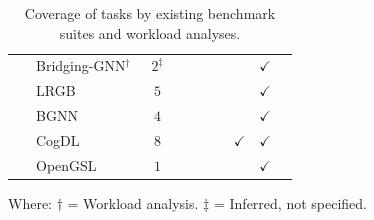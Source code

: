 \begin{landscape}
\begin{table}[htbp]
{\begin{tabular}{ll|cccccccc}
                { ~              }  & { Bridging-GNN$^{\dagger}$~\cite{Huang2021}  }   &    $2^{\ddagger}$       &               &               &               &                &               & $\checkmark$ &               \\
                { ~              }  & { LRGB~\cite{Dwivedi2022}                 }      &    $5$       &               &               &               &                &               & $\checkmark$ &               \\
                { ~              }  & { BGNN~\cite{Dwivedi2023}                 }      &    $4$       &               &               &               &                &               & $\checkmark$ &               \\
                { ~              }  & { CogDL~\cite{Cen2023}                    }      &    $8$       &               &               &               &                & $\checkmark$  & $\checkmark$ &               \\
                { ~              }  & { OpenGSL~\cite{Zhou2024}               }        &    $1$       &               &               &               &                &               & $\checkmark$ &               \\
            \end{tabular}
            \caption{Coverage of \gai tasks by existing benchmark suites and workload analyses.}
            \label{Table:benchmark-kernels}
        }
    \end{table}
    {   
        \noindent
        \scriptsize 
        Where: 
        \textbf{$\dagger$} = Workload analysis. 
        \textbf{$\ddagger$} = Inferred, not specified.
        }
\end{landscape}